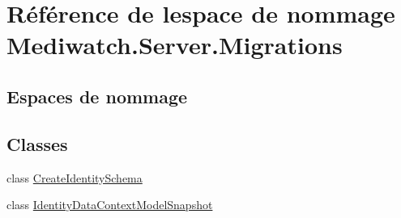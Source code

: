 \hypertarget{namespace_mediwatch_1_1_server_1_1_migrations}{}\section{Référence de l\textquotesingle{}espace de nommage Mediwatch.\+Server.\+Migrations}
\label{namespace_mediwatch_1_1_server_1_1_migrations}
\subsection*{Espaces de nommage}
\begin{DoxyCompactItemize}
\end{DoxyCompactItemize}
\subsection*{Classes}
\begin{DoxyCompactItemize}
\item 
class \hyperlink{class_mediwatch_1_1_server_1_1_migrations_1_1_create_identity_schema}{Create\+Identity\+Schema}
\item 
class \hyperlink{class_mediwatch_1_1_server_1_1_migrations_1_1_identity_data_context_model_snapshot}{Identity\+Data\+Context\+Model\+Snapshot}
\end{DoxyCompactItemize}
